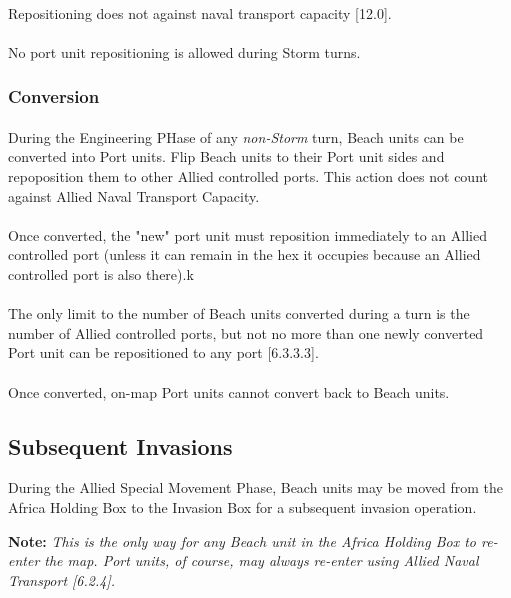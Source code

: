 \paragraph{}
Repositioning does not against naval transport capacity [12.0].

\paragraph{}
No port unit repositioning is allowed during Storm turns.

\subsubsection{Conversion}

\paragraph{}
During the Engineering PHase of any \textit{non-Storm} turn, Beach units can be converted into Port units. Flip Beach units to their Port unit sides and repoposition them to other Allied controlled ports. This action does not count against Allied Naval Transport Capacity.

\paragraph{}
Once converted, the "new" port unit must reposition immediately to an Allied controlled port (unless it can remain in the hex it occupies because an Allied controlled port is also there).k

\paragraph{}
The only limit to the number of Beach units converted during a turn is the number of Allied controlled ports, but not no more than one newly converted Port unit can be repositioned to any port [6.3.3.3].

\paragraph{}
Once converted, on-map Port units cannot convert back to Beach units.

\subsection{Subsequent Invasions}
During the Allied Special Movement Phase, Beach units may be moved from the Africa Holding Box to the Invasion Box for a subsequent invasion operation.

\textbf{Note:} \textit{This is the only way for any Beach unit in the Africa Holding Box to re-enter the map. Port units, of course, may always re-enter using Allied Naval Transport [6.2.4].}